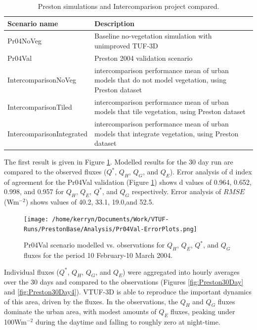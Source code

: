 \documentclass[preprint,12pt,authoryear]{elsarticle}
\begin{document}
\begin{center}
\begin{table}[!htbp]
\caption{Preston simulations and Intercomparison project compared.\label{tab:simscompared}} 
\begin{tabular}{  | p{0.30\linewidth} | p{0.70\linewidth} |  } 
\hline \textbf{Scenario name} & \textbf{Description}  \\ \hline
Pr04NoVeg & Baseline no-vegetation simulation with unimproved TUF-3D    \\ \hline
Pr04Val & Preston 2004 validation scenario  \\ \hline	
IntercomparisonNoVeg & \cite{Best2012} intercomparison performance mean of urban models that do not model vegetation, using \cite{Coutts2007} Preston dataset  \\ \hline
IntercomparisonTiled & \cite{Best2012} intercomparison performance mean of urban models that tile vegetation, using \cite{Coutts2007} Preston dataset  \\ \hline
IntercomparisonIntegrated & \cite{Best2012} intercomparison performance mean of urban models that integrate vegetation, using \cite{Coutts2007} Preston dataset  \\ \hline
  \end{tabular} 
\end{table}
\end{center}  

The first result is given in Figure \ref{fig:Preston6error}. Modelled results for the 30 day run are compared to the observed fluxes ($Q^{*}$, $Q_{H}$, $Q_{G}$, and $Q_{E}$). Error analysis of d index of agreement for the Pr04Val validation (Figure \ref{fig:Preston6error}) shows d values of 0.964, 0.652, 0.998, and 0.957 for $Q_{H}$, $Q_{E}$, $Q^{*}$, and $Q_{G}$ respectively. Error analysis of $RMSE$ (Wm$^{-2}$) shows values of 40.2, 33.1, 19.0,and 52.5. 

\begin{figure}[!htbp]
\texttt{[image: /home/kerryn/Documents/Work/VTUF-Runs/PrestonBase/Analysis/Pr04Val-ErrorPlots.png]}
\caption{Pr04Val scenario modelled vs. observations for $Q_{H}$, $Q_{E}$, $Q^{*}$, and $Q_{G}$ fluxes for the period 10 February-10 March 2004. \label{fig:Preston6error}}   
\end{figure}

Individual fluxes ($Q^{*}$, $Q_{H}$, $Q_{G}$, and $Q_{E}$) were aggregated into hourly averages over the 30 days and compared to the observations (Figures \ref{fig:Preston30Day} and \ref{fig:Preston30Day4}). VTUF-3D is able to reproduce the important dynamics of this area, driven by the fluxes. In the observations, the $Q_{H}$ and $Q_{G}$ fluxes dominate the urban area, with modest amounts of $Q_{E}$ fluxes, peaking under 100Wm$^{-2}$ during the daytime and falling to roughly zero at night-time. 
\end{document}
